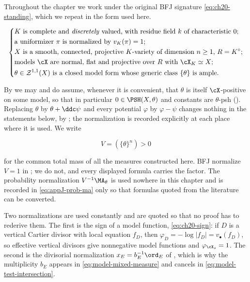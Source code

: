 Throughout the chapter we work under the original BFJ signature
\eqref{eq:ch20-standing}, which we repeat in the form used here.

\begin{equation}
\label{eq:ch24-standing}
\left\{
\begin{aligned}
 &\text{\(K\) is complete and \emph{discretely} valued, with residue field
   \(k\) of characteristic \(0\);}\\
 &\text{a uniformizer \(\pi\) is normalized by \(v_K(\pi)=1\); }\\
 &\text{\(X\) is a smooth, connected, projective \(K\)-variety of dimension
   \(n\geq1\), \(R=K^\circ\);}\\
 &\text{models \(\cX\) are normal, flat and projective over \(R\) with
   \(\cX_K\simeq X\);}\\
 &\text{\(\theta\in\mathcal Z^{1,1}(X)\) is a closed model form whose generic
   class \(\{\theta\}\) is ample.}
\end{aligned}
\right.
\end{equation}

By  we may and do assume, whenever it
is convenient, that \(\theta\) is itself \(\cX\)-positive on some model, so
that in particular \(0\in\PSH(X,\theta)\) and constants are
\(\theta\)-psh ().  Replacing \(\theta\) by
\(\theta+\ddc\psi\) and every potential \(\varphi\) by \(\varphi-\psi\)
changes nothing in the statements below, by
; the normalization is recorded
explicitly at each place where it is used.  We write

\begin{equation}
\label{eq:ch24-volume}
                V=(\{\theta\}^n)>0
\end{equation}

for the common total mass of all the measures constructed here.  BFJ
normalize \(V=1\) in \cite{BFJ15}; we do not, and every displayed formula
carries the factor.  The probability normalization \(V^{-1}\MA_\theta\) is
used nowhere in this chapter and is recorded in
\eqref{eq:appJ-prob-ma} only so that formulas quoted from the literature can
be converted.

Two normalizations are used constantly and are quoted so that no proof has
to rederive them.  The first is the sign of a model function,
\eqref{eq:ch20-sign}: if \(D\) is a vertical Cartier divisor with local
equation \(f_D\), then \(\varphi_D=-\log|f_D|=v_\bullet(f_D)\), so effective
vertical divisors give nonnegative model functions and
\(\varphi_{\cX_s}=1\).  The second is the divisorial normalization
\(x_E=b_E^{-1}\ord_E\) of , which is why
the multiplicity \(b_E\) appears in \eqref{eq:model-mixed-measure} and
cancels in \eqref{eq:model-test-intersection}.


